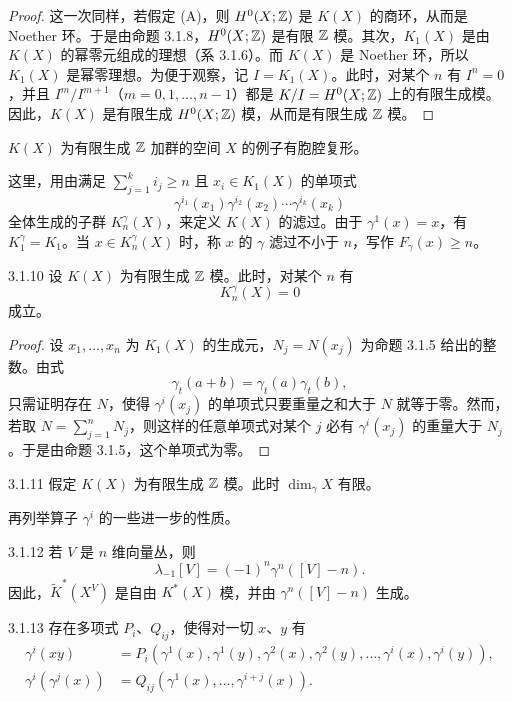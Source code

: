 \begin{proof}
这一次同样，若假定 (A)，则 $H^0(X;\mathbb{Z})$ 是 $K(X)$ 的商环，从而是 Noether 环。于是由命题 3.1.8，$H^0(X;\mathbb{Z})$ 是有限 $\mathbb{Z}$ 模。其次，$K_1(X)$ 是由 $K(X)$ 的幂零元组成的理想（系 3.1.6）。而 $K(X)$ 是 Noether 环，所以 $K_1(X)$ 是幂零理想。为便于观察，记 $I=K_1(X)$。此时，对某个 $n$ 有 $I^n=0$，并且 $I^m/I^{m+1}$（$m=0,1,\dots,n-1$）都是 $K/I=H^0(X;\mathbb{Z})$ 上的有限生成模。因此，$K(X)$ 是有限生成 $H^0(X;\mathbb{Z})$ 模，从而是有限生成 $\mathbb{Z}$ 模。
\end{proof}

$K(X)$ 为有限生成 $\mathbb{Z}$ 加群的空间 $X$ 的例子有胞腔复形。

这里，用由满足 $\sum_{j=1}^{k}i_j\ge n$ 且 $x_i\in K_1(X)$ 的单项式
\[
\gamma^{i_1}(x_1)\gamma^{i_2}(x_2)\cdots\gamma^{i_k}(x_k)
\]
全体生成的子群 $K_n^\gamma(X)$，来定义 $K(X)$ 的滤过。由于 $\gamma^1(x)=x$，有 $K_1^\gamma=K_1$。当 $x\in K_n^\gamma(X)$ 时，称 $x$ 的 $\gamma$ 滤过不小于 $n$，写作 $F_\gamma(x)\ge n$。

\begin{proposition*}{3.1.10}
设 $K(X)$ 为有限生成 $\mathbb{Z}$ 模。此时，对某个 $n$ 有
\[
K_n^\gamma(X)=0
\]
成立。
\end{proposition*}

\begin{proof}
设 $x_1,\dots,x_n$ 为 $K_1(X)$ 的生成元，$N_j=N(x_j)$ 为命题 3.1.5 给出的整数。由式
\[
\gamma_t(a+b)=\gamma_t(a)\gamma_t(b),
\]
只需证明存在 $N$，使得 $\gamma^i(x_j)$ 的单项式只要重量之和大于 $N$ 就等于零。然而，若取 $N=\sum_{j=1}^{n}N_j$，则这样的任意单项式对某个 $j$ 必有 $\gamma^i(x_j)$ 的重量大于 $N_j$。于是由命题 3.1.5，这个单项式为零。
\end{proof}

\begin{corollary*}{3.1.11}
假定 $K(X)$ 为有限生成 $\mathbb{Z}$ 模。此时 $\dim_\gamma X$ 有限。
\end{corollary*}

再列举算子 $\gamma^i$ 的一些进一步的性质。

\begin{proposition*}{3.1.12}
若 $V$ 是 $n$ 维向量丛，则
\[
\lambda_{-1}[V]=(-1)^n\gamma^n([V]-n).
\]
因此，$\tilde K^*(X^V)$ 是自由 $K^*(X)$ 模，并由 $\gamma^n([V]-n)$ 生成。
\end{proposition*}

\begin{proposition*}{3.1.13}
存在多项式 $P_i$、$Q_{ij}$，使得对一切 $x$、$y$ 有
\begin{align*}
\gamma^i(xy)&=P_i(\gamma^1(x),\gamma^1(y),\gamma^2(x),\gamma^2(y),\dots,\gamma^i(x),\gamma^i(y)),\\
\gamma^i(\gamma^j(x))&=Q_{ij}(\gamma^1(x),\dots,\gamma^{i+j}(x)).
\end{align*}
\end{proposition*}

